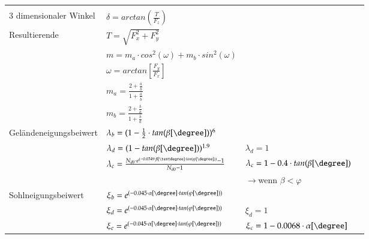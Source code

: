 \begin{minipage}{0.85\linewidth}
\begin{tabular}{l|l|ll}
								&&& \\
		3 dimensionaler Winkel	& $ \delta = arctan \left( \frac{T}{F_z}\right) $		 & 	& 	\\
		Resultierende			& $ T = \sqrt{F_x^2 + F_y^2} $ &  &	 \\
								& $ m = m_a \cdot cos^2 (\omega) + m_b \cdot sin^2 (\omega) $ & & \\
								& $ \omega = arctan \left[ \frac{F_y}{F_x} \right] $ &  & \\
								& $ m_a = \frac{2 + \frac{\bar{a}}{\bar{b}}}{1 + \frac{\bar{a}}{\bar{b}}} $ & & \\
								& $ m_b = \frac{2 + \frac{\bar{b}}{\bar{a}}}{1 + \frac{\bar{b}}{\bar{a}}} $ & & %
								\\ \hline
		Geländeneigungsbeiwert & $ \lambda_b = (1 - \frac{1}{2} \cdot tan (\beta [\degree] ) ) ^6 $ 	& & \\
								& $ \lambda_d = (1 - tan (\beta [\degree] ) ) ^{1.9} $	& $ \lambda_d = 1 $ & \\
								& $ \lambda_c = \frac{N_{d0} \cdot e ^{ (-0.0349 \cdot \beta [°] \cdot tan (\varphi [\degree] ) ) } -1 }{N_{d0} - 1} $	& $ \lambda_c = 1- 0.4 \cdot tan ( \beta [\degree] ) $ \\
								&	& $ \rightarrow $wenn $ \beta < \varphi $ & %
								\\ \hline 
		Sohlneigungsbeiwert		& $ \xi_b = e ^{(-0.045 \cdot \alpha [\degree] \cdot tan (\varphi [\degree]))} $	&	& \\
								& $ \xi_d = e ^{(-0.045 \cdot \alpha [\degree] \cdot tan (\varphi [\degree]))} $	& $ \xi_d = 1 $ & \\
								& $ \xi_c = e ^{(-0.045 \cdot \alpha [\degree] \cdot tan (\varphi [\degree]))} $ & $ \xi_c = 1 - 0.0068 \cdot \alpha [\degree] $ & %
								\\ \hline			
		
	\end{tabular}
\end{minipage}
